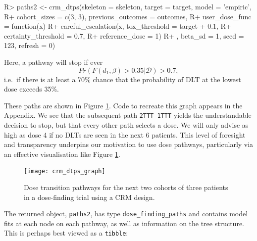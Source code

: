 \documentclass[article]{jss}
\begin{document}
\begin{CodeChunk}

\begin{CodeInput}
R> paths2 <- crm_dtps(skeleton = skeleton, target = target, model = 'empiric',
R+                    cohort_sizes = c(3, 3), previous_outcomes = outcomes,
R+                    user_dose_func = function(x) {
R+                      careful_escalation(x, tox_threshold = target + 0.1, 
R+                                         certainty_threshold = 0.7,
R+                                         reference_dose = 1)
R+                    }, beta_sd = 1, seed = 123, refresh = 0)
\end{CodeInput}
\end{CodeChunk}

Here, a pathway will stop if ever \begin{equation}
Pr( F(d_1, \beta) > 0.35 | \mathcal{D}) > 0.7,
\end{equation} i.e.~if there is at least a 70\% chance that the
probability of DLT at the lowest dose exceeds 35\%.

These paths are shown in Figure \ref{fig:crm_dtps_graph}. Code to
recreate this graph appears in the Appendix. We see that the subsequent
path \texttt{2TTT\ 1TTT} yields the understandable decision to stop, but
that every other path selects a dose. We will only advise as high as
dose 4 if no DLTs are seen in the next 6 patients. This level of
foresight and transparency underpins our motivation to use dose
pathways, particularly via an effective visualisation like Figure
\ref{fig:crm_dtps_graph}.

\begin{figure}
  \centering
  \texttt{[image: crm\_dtps\_graph]}
  \caption{Dose transition pathways for the next two cohorts of three patients in a dose-finding trial using a CRM design.}
  \label{fig:crm_dtps_graph}
\end{figure}

The returned object, \texttt{paths2}, has type
\texttt{dose\_finding\_paths} and contains model fits at each node on
each pathway, as well as information on the tree structure. This is
perhaps best viewed as a \texttt{tibble}:
\end{document}
